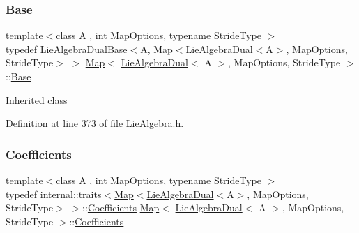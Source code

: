 \subsubsection{\texorpdfstring{Base}{Base}}
{\footnotesize\ttfamily template$<$class A , int Map\+Options, typename Stride\+Type $>$ \\
typedef \hyperlink{class_lie_algebra_dual_base}{Lie\+Algebra\+Dual\+Base}$<$A, \hyperlink{class_map_3_01_lie_algebra_dual_3_01_a_01_4_00_01_map_options_00_01_stride_type_01_4_a343da7ed6d4069324cd174c8fa51a43f}{Map}$<$\hyperlink{class_lie_algebra_dual}{Lie\+Algebra\+Dual}$<$A$>$, Map\+Options, Stride\+Type$>$ $>$ \hyperlink{class_map_3_01_lie_algebra_dual_3_01_a_01_4_00_01_map_options_00_01_stride_type_01_4_a343da7ed6d4069324cd174c8fa51a43f}{Map}$<$ \hyperlink{class_lie_algebra_dual}{Lie\+Algebra\+Dual}$<$ A $>$, Map\+Options, Stride\+Type $>$\+::\hyperlink{class_map_3_01_lie_algebra_dual_3_01_a_01_4_00_01_map_options_00_01_stride_type_01_4_ad1209b4cd7e7831c3556bae3a466822b}{Base}\hspace{0.3cm}{\ttfamily [protected]}}

Inherited class 

Definition at line 373 of file Lie\+Algebra.\+h.

\hypertarget{class_map_3_01_lie_algebra_dual_3_01_a_01_4_00_01_map_options_00_01_stride_type_01_4_ab39602ca662c12f4aa9031d05157fb73}{}\label{class_map_3_01_lie_algebra_dual_3_01_a_01_4_00_01_map_options_00_01_stride_type_01_4_ab39602ca662c12f4aa9031d05157fb73} 
\subsubsection{\texorpdfstring{Coefficients}{Coefficients}}
{\footnotesize\ttfamily template$<$class A , int Map\+Options, typename Stride\+Type $>$ \\
typedef internal\+::traits$<$\hyperlink{class_map_3_01_lie_algebra_dual_3_01_a_01_4_00_01_map_options_00_01_stride_type_01_4_a343da7ed6d4069324cd174c8fa51a43f}{Map}$<$\hyperlink{class_lie_algebra_dual}{Lie\+Algebra\+Dual}$<$A$>$, Map\+Options, Stride\+Type$>$ $>$\+::\hyperlink{class_map_3_01_lie_algebra_dual_3_01_a_01_4_00_01_map_options_00_01_stride_type_01_4_ab39602ca662c12f4aa9031d05157fb73}{Coefficients} \hyperlink{class_map_3_01_lie_algebra_dual_3_01_a_01_4_00_01_map_options_00_01_stride_type_01_4_a343da7ed6d4069324cd174c8fa51a43f}{Map}$<$ \hyperlink{class_lie_algebra_dual}{Lie\+Algebra\+Dual}$<$ A $>$, Map\+Options, Stride\+Type $>$\+::\hyperlink{class_map_3_01_lie_algebra_dual_3_01_a_01_4_00_01_map_options_00_01_stride_type_01_4_ab39602ca662c12f4aa9031d05157fb73}{Coefficients}}

